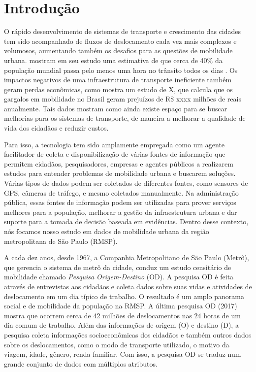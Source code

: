 \chapter{Introdução}
\label{cap:introducao}

O rápido  desenvolvimento de sistemas de transporte e crescimento das cidades
tem sido acompanhado de fluxos de deslocamento cada vez mais complexos e
volumosos, aumentando também os desafios para as questões de mobilidade urbana. 
\cite{Zhang2011} mostram em seu estudo uma estimativa de que cerca de 40\% da população mundial passa pelo menos uma
hora no trânsito todos os dias \citep{Zhang2011}. Os impactos negativos de
uma infraestrutura de transporte ineficiente também geram perdas econômicas,
como mostra um estudo de X, que calcula que
os gargalos em mobilidade no Brasil geram prejuízos de R\$ xxxx milhões de
reais anualmente. Tais dados mostram como ainda existe espaço para se buscar
melhorias para os sistemas de transporte, de maneira
a melhorar a qualidade de vida dos cidadãos e reduzir custos.

Para isso, a tecnologia tem sido amplamente empregada como um agente
facilitador de coleta e disponibilização de várias fontes de informação que
permitem cidadãos, pesquisadores, empresas e agentes públicos a realizarem
estudos para entender problemas de mobilidade urbana e buscarem soluções.
Várias tipos de dados podem ser coletados de diferentes fontes, como sensores
de GPS, câmeras de tráfego, e mesmo coletados manualmente. Na administração
pública, essas fontes de informação podem ser utilizadas para prover serviços
melhores para a população, melhorar a gestão da infraestrutura urbana e dar
suporte para a tomada de decisão baseada em evidências. Dentro desse
contexto, nós focamos nosso estudo em dados de mobilidade urbana da região
metropolitana de S\~ao Paulo (RMSP).

A cada dez anos, desde 1967, a Companhia Metropolitano de São Paulo (Metrô),
que gerencia o sistema de metrô da cidade, conduz um estudo censitário de
mobilidade chamado \emph{Pesquisa Origem-Destino} (OD). A pesquisa OD é feita
através de entrevistas aos cidadãos e coleta dados sobre suas vidas e
atividades de deslocamento em um dia típico de trabalho. O resultado é um amplo
panorama social e de mobilidade da população na RMSP. A última pesquisa OD
(2017) mostra que ocorrem cerca de 42 milhões de deslocamentos nas 24 horas de
um dia comum de trabalho. Além das informações de origem (O) e destino (D), a
pesquisa coleta informações socioeconômicas dos cidadãos e também outros dados
sobre os deslocamentos, como o modo de transporte utilizado, o motivo da
viagem, idade, gênero, renda familiar. Com isso, a pesquisa OD se traduz num
grande conjunto de dados com múltiplos atributos.


